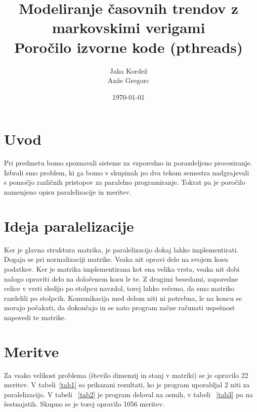 \documentclass[a4paper,11pt]{article}
\title{Modeliranje časovnih trendov z markovskimi verigami \\ \large  Poročilo izvorne kode (pthreads)}
\author{Jaka Kordež \\ Anže Gregorc}
\date{\today}
\begin{document}
\maketitle

\section{Uvod}

Pri predmetu bomo spoznavali sisteme za vzporedno in porazdeljeno procesiranje. Izbrali smo problem, ki ga bomo v skupinah po dva tekom semestra nadgrajevali s pomočjo različnih pristopov za paralelno programiranje. Tokrat pa je poročilo namenjeno opisu paralelizacije in meritev.

\section{Ideja paralelizacije}

Ker je glavna struktura matrika, je paralelizacijo dokaj lahko implementirati. Dogaja se pri normalizaciji matrike. Vsaka nit opravi delo na svojem kosu podatkov. Ker je matrika implementirana kot ena velika vrsta, vsaka nit dobi nalogo opraviti delo na določenem kosu le te. Z drugimi besedami, zaporedne celice v vrsti sledijo po stolpcu navzdol, torej lahko rečemo, da smo matriko razdelili po stolpcih. Komunikacija med delom niti ni potrebna, le na koncu se morajo počakati, da dokončajo in se nato program začne računati uspešnost napovedi te matrike.

\section{Meritve}
Za vsako velikost problema (število dimenzij in stanj v matriki) se je opravilo 22 meritev. V tabeli~\ref{tab1} so prikazani rezultati, ko je program uporabljal 2 niti za paralelizacijo. V tabeli ~\ref{tab2} je program deloval na osmih, v tabeli ~\ref{tab3} pa na šestnajstih. Skupno se je torej opravilo 1056 meritev.
\end{document}
